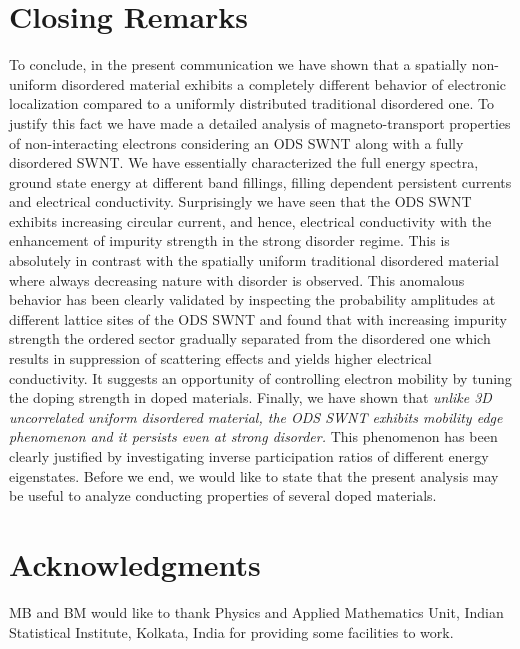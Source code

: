 \documentclass[prb,aps,twocolumn,amsmath,amssymb,floatfix,
superscriptaddress]{revtex4}
\begin{document}
\section{Closing Remarks}

To conclude, in the present communication we have shown that a spatially 
non-uniform disordered material exhibits a completely different behavior of
electronic localization compared to a uniformly distributed traditional 
disordered one. To justify this fact we have made a detailed analysis
of magneto-transport properties of non-interacting electrons considering 
an ODS SWNT along with a fully disordered SWNT. We have essentially 
characterized the full energy spectra, ground state energy at different band
fillings, filling dependent persistent currents and electrical conductivity.
Surprisingly we have seen that the ODS SWNT exhibits increasing circular
current, and hence, electrical conductivity with the enhancement of impurity
strength in the strong disorder regime. This is absolutely in contrast with
the spatially uniform traditional disordered material where always decreasing
nature with disorder is observed. This anomalous behavior has been clearly 
validated by inspecting the probability amplitudes at different lattice sites
of the ODS SWNT and found that with increasing impurity strength the ordered
sector gradually separated from the disordered one which results in suppression
of scattering effects and yields higher electrical conductivity. It suggests 
an opportunity of controlling electron mobility by tuning the doping strength
in doped materials. Finally, we have shown that {\em unlike 3D uncorrelated uniform
disordered material, the ODS SWNT exhibits mobility edge phenomenon and it 
persists even at strong disorder.} This phenomenon has been clearly justified by
investigating inverse participation ratios of different energy eigenstates.
Before we end, we would like to state that the present analysis may be useful
to analyze conducting properties of several doped materials.
 
\section{Acknowledgments}

MB and BM would like to thank Physics and Applied Mathematics Unit, Indian 
Statistical Institute, Kolkata, India for providing some facilities to work.
\end{document}
